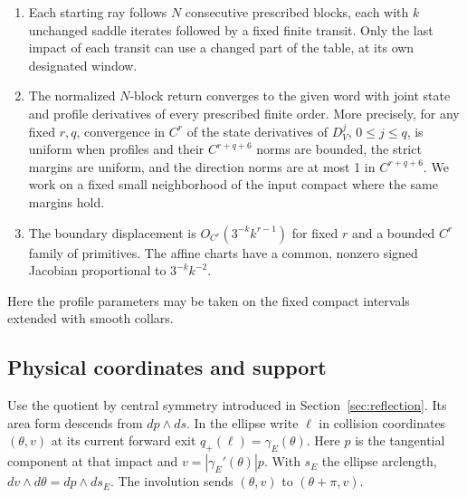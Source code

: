 \documentclass[11pt]{article}
\providecommand{\tightlist}{\setlength{\itemsep}{0pt}\setlength{\parskip}{0pt}}
\begin{document}
\begin{enumerate}
\def\labelenumi{\arabic{enumi}.}
\tightlist
\item
  Each starting ray follows \(N\) consecutive prescribed blocks, each with \(k\)
  unchanged saddle iterates followed by a fixed finite transit. Only the last
  impact of each transit can use a changed part of the table, at its own
  designated window.
\item
  The normalized \(N\)-block return converges to the given word with joint state
  and profile derivatives of every prescribed finite order. More precisely, for
  any fixed \(r,q\), convergence in \(C^r\) of the state derivatives of
  \(D_V^j\), \(0\le j\le q\), is uniform when profiles and their \(C^{r+q+6}\)
  norms are bounded, the strict margins are uniform, and the direction norms are
  at most 1 in \(C^{r+q+6}\). We work on a fixed small neighborhood of the input
  compact where the same margins hold.
\item
  The boundary displacement is \(O_{C^r}(3^{-k}k^{r-1})\) for fixed \(r\) and a
  bounded \(C^r\) family of primitives. The affine charts have a common, nonzero
  signed Jacobian proportional to \(3^{-k}k^{-2}\).
\end{enumerate}

Here the profile parameters may be taken on the fixed compact intervals extended
with smooth collars.

\subsection{Physical coordinates and
support}\label{physical-coordinates-and-support}

Use the quotient by central symmetry introduced in
Section~\ref{sec:reflection}. Its area form descends from \(dp\wedge ds\).
In the ellipse write \(\ell\) in collision coordinates \((\theta,v)\)
at its current forward exit \(q_+(\ell)=\gamma_E(\theta)\). Here
\(p\) is the tangential component at that impact and
\(v=|\gamma_E'(\theta)|p\). With \(s_E\) the ellipse arclength,
\(dv\wedge d\theta=dp\wedge ds_E\).
The involution sends \((\theta,v)\) to \((\theta+\pi,v)\).
\end{document}
